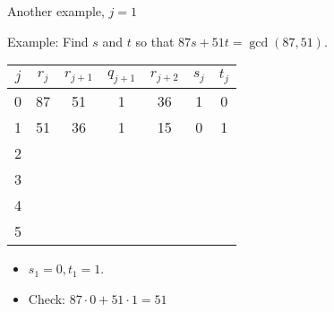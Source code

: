 \documentclass[handout]{beamer}
\begin{document}
\begin{frame}{Another example, $j=1$}

Example: Find $s$ and $t$ so that $87s+51t = \gcd(87, 51)$.

\vspace{1em}

\begin{tabular}{|c|c|c|c|c|c|c|}\hline
$j$   &  $r_{j}$    & $r_{j+1}$ & $q_{j+1}$ & $r_{j+2}$ & $s_j$ & $t_j$ \\ \hline\hline
0     &  87         &  51       &    1      &   36      &  1    &   0   \\ \hline
1     &  51         &  36       &    1      &   15      &  0    &   1   \\ \hline
2     &             &           &           &           &       &       \\ \hline
3     &             &           &           &           &       &       \\ \hline
4     &             &           &           &           &       &       \\ \hline
5     &             &           &           &           &       &       \\ \hline
\end{tabular}

\vspace{1em}

\begin{itemize}
  \item $s_1 = 0, t_1 = 1$.
  \item Check: $87\cdot 0 + 51\cdot 1 = 51$
\end{itemize}

\end{frame}
\end{document}

